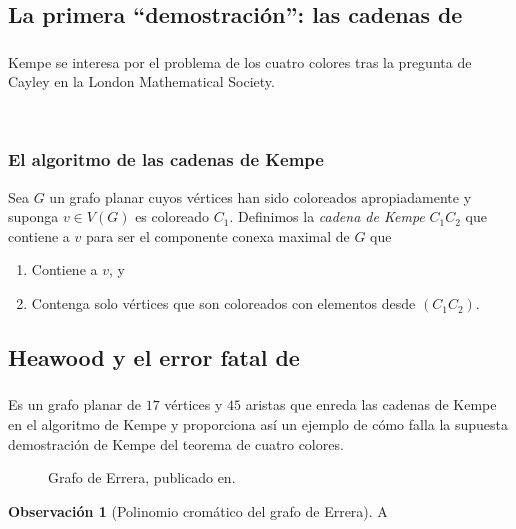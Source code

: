 \documentclass[spanish, utf8,handout]{beamer} %
\theoremstyle{definition}
\newtheorem{remark}{Observación}
\begin{document}
\subsection{La primera ``demostración'': las cadenas de \citeauthor{kempe}}

\begin{frame}\transblindsvertical
\frametitle{\insertsubsection}

Kempe se interesa por el problema de los cuatro colores tras la pregunta de Cayley en la London Mathematical Society.

\


\end{frame}

\begin{frame}
\frametitle{El algoritmo de las cadenas de Kempe}

\begin{definition}
Sea $G$ un grafo planar cuyos vértices han sido coloreados apropiadamente y suponga $v\in V(G)$ es coloreado $C_1$. Definimos la \emph{cadena de Kempe} $C_1C_2$ que contiene a $v$ para ser el componente conexa maximal de $G$ que
\begin{enumerate}%
	\item Contiene a $v$, y
	\item Contenga solo vértices que son coloreados con elementos desde $(C_1C_2)$.
\end{enumerate}
\end{definition}
\end{frame}

\subsection{Heawood y el error fatal de \citeauthor{kempe}}

\begin{frame}[allowframebreaks]
\frametitle{\insertsubsection}

\begin{example}
Es un grafo planar de $17$ vértices y $45$ aristas que enreda las cadenas de Kempe en el algoritmo de Kempe y proporciona así un ejemplo de cómo falla la supuesta demostración de Kempe del teorema de cuatro colores.
\end{example}

\begin{figure}[H]
	\centering
	\scalebox{.3}{}
	\caption{Grafo de Errera, publicado en.}
	\end{figure}

\begin{remark}[Polinomio cromático del grafo de Errera]
A
\end{remark}
\end{frame}
\end{document}
